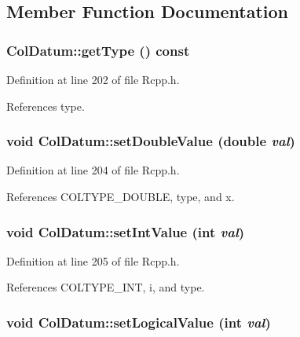 \subsection{Member Function Documentation}
\hypertarget{classColDatum_ae862d41617b3ae39f88b5b729ccccc3}{
\subsubsection[getType]{ ColDatum::getType () const}}
\label{classColDatum_ae862d41617b3ae39f88b5b729ccccc3}




Definition at line 202 of file Rcpp.h.

References type.\hypertarget{classColDatum_edf3ac3ea399222524f02f3468ec97a0}{
\subsubsection[setDoubleValue]{\setlength{\rightskip}{0pt plus 5cm}void ColDatum::setDoubleValue (double {\em val})}}
\label{classColDatum_edf3ac3ea399222524f02f3468ec97a0}




Definition at line 204 of file Rcpp.h.

References COLTYPE\_\-DOUBLE, type, and x.\hypertarget{classColDatum_80d401e1efb6e714113990c78e72eb84}{
\subsubsection[setIntValue]{\setlength{\rightskip}{0pt plus 5cm}void ColDatum::setIntValue (int {\em val})}}
\label{classColDatum_80d401e1efb6e714113990c78e72eb84}




Definition at line 205 of file Rcpp.h.

References COLTYPE\_\-INT, i, and type.\hypertarget{classColDatum_19ebd9c0e3e2544c8679999ab91c9e20}{
\subsubsection[setLogicalValue]{\setlength{\rightskip}{0pt plus 5cm}void ColDatum::setLogicalValue (int {\em val})}}
\label{classColDatum_19ebd9c0e3e2544c8679999ab91c9e20}





